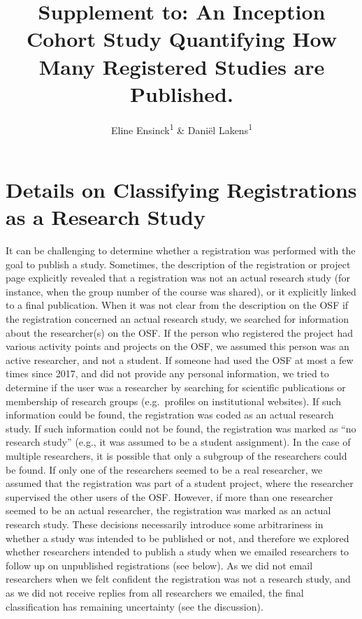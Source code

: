\documentclass[
  ,jou, a4paper,floatsintext]{apa6}
\title{Supplement to: An Inception Cohort Study Quantifying How Many Registered Studies are Published.}
\author{Eline Ensinck\textsuperscript{1} \& Daniël Lakens\textsuperscript{1}}
\date{}
\affiliation{\vspace{0.5cm}\textsuperscript{1} Eindhoven University of Technology}
\begin{document}
\maketitle

\hypertarget{details-on-classifying-registrations-as-a-research-study}{%
\section{Details on Classifying Registrations as a Research Study}\label{details-on-classifying-registrations-as-a-research-study}}

It can be challenging to determine whether a registration was performed with the goal to publish a study. Sometimes, the description of the registration or project page explicitly revealed that a registration was not an actual research study (for instance, when the group number of the course was shared), or it explicitly linked to a final publication. When it was not clear from the description on the OSF if the registration concerned an actual research study, we searched for information about the researcher(s) on the OSF. If the person who registered the project had various activity points and projects on the OSF, we assumed this person was an active researcher, and not a student. If someone had used the OSF at most a few times since 2017, and did not provide any personal information, we tried to determine if the user was a researcher by searching for scientific publications or membership of research groups (e.g.~profiles on institutional websites). If such information could be found, the registration was coded as an actual research study. If such information could not be found, the registration was marked as ``no research study'' (e.g., it was assumed to be a student assignment). In the case of multiple researchers, it is possible that only a subgroup of the researchers could be found. If only one of the researchers seemed to be a real researcher, we assumed that the registration was part of a student project, where the researcher supervised the other users of the OSF. However, if more than one researcher seemed to be an actual researcher, the registration was marked as an actual research study. These decisions necessarily introduce some arbitrariness in whether a study was intended to be published or not, and therefore we explored whether researchers intended to publish a study when we emailed researchers to follow up on unpublished registrations (see below). As we did not email researchers when we felt confident the registration was not a research study, and as we did not receive replies from all researchers we emailed, the final classification has remaining uncertainty (see the discussion).
\end{document}
